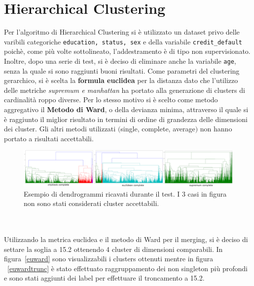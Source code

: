 \section{Hierarchical Clustering}
Per l'algoritmo di Hierarchical Clustering si \`e utilizzato un dataset privo delle varibili categoriche \texttt{education, status, sex} e della variabile \texttt{credit\_default} poich\`e, come pi\`u volte sottolineato, l'addestramento \`e di tipo non supervisionato. Inoltre, dopo una serie di test, si \`e deciso di eliminare anche la variabile \texttt{age}, senza la quale si sono raggiunti buoni risultati. Come parametri del clustering gerarchico, si \`e scelta la \textbf{formula euclidea} per la distanza dato che l'utilizzo delle metriche \textit{supremum e manhattan} ha portato alla generazione di clusters di cardinalit\`a roppo diverse. Per lo stesso motivo si \`e scelto come metodo aggregativo il \textbf{Metodo di Ward}, o della devianza minima, attraverso il quale si \`e raggiunto il miglior risultato in termini di ordine di grandezza delle dimensioni dei cluster. Gli altri metodi utilizzati $($single, complete, average$)$ non hanno portato a risultati accettabili.
\begin{figure}[H]
\includegraphics[width=\linewidth]{img/complete.png}
\caption{Esempio di dendrogrammi ricavati durante il test. I 3 casi in figura non sono stati considerati cluster accettabili.}
\label{dendro-complete}
\end{figure} 
\mbox{}\\
\mbox{}\\
Utilizzando la metrica euclidea e il metodo di Ward per il merging, si \`e deciso di settare la soglia a 15.2 ottenendo 4 cluster di dimensioni comparabili. In figura~\ref{euward} sono visualizzabili i clusters ottenuti mentre in figura ~\ref{euwardtrunc} \`e stato effettuato raggruppamento dei non singleton pi\`u profondi e sono stati aggiunti dei label per effettuare il troncamento a 15.2.
